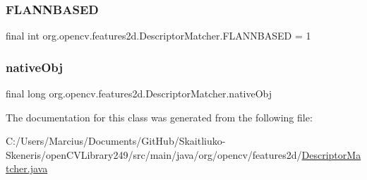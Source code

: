 \subsubsection{\texorpdfstring{F\+L\+A\+N\+N\+B\+A\+S\+ED}{FLANNBASED}}
{\footnotesize\ttfamily final int org.\+opencv.\+features2d.\+Descriptor\+Matcher.\+F\+L\+A\+N\+N\+B\+A\+S\+ED = 1\hspace{0.3cm}{\ttfamily [static]}}

\mbox{\label{classorg_1_1opencv_1_1features2d_1_1_descriptor_matcher_a9e8464485925fc0504cfefec24d4b299}} 
\subsubsection{\texorpdfstring{native\+Obj}{nativeObj}}
{\footnotesize\ttfamily final long org.\+opencv.\+features2d.\+Descriptor\+Matcher.\+native\+Obj\hspace{0.3cm}{\ttfamily [protected]}}



The documentation for this class was generated from the following file\+:\begin{DoxyCompactItemize}
\item 
C\+:/\+Users/\+Marcius/\+Documents/\+Git\+Hub/\+Skaitliuko-\/\+Skeneris/open\+C\+V\+Library249/src/main/java/org/opencv/features2d/\mbox{\hyperlink{_descriptor_matcher_8java}{Descriptor\+Matcher.\+java}}\end{DoxyCompactItemize}
